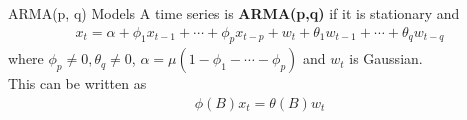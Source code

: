\documentclass[ignorenonframetext,xcolor=x11names]{beamer}
\begin{document}
\begin{frame}[label=full]{ARMA(p, q) Models}
A time series is \textbf{ARMA(p,q)} if it is stationary and
\begin{align*}
x_t = \alpha + \phi_1 x_{t-1} + \cdots + \phi_p x_{t-p} + w_t + \theta_1 w_{t-1} + \cdots + \theta_q w_{t-q} 
\end{align*}
where $\phi_p \neq 0, \theta_q \neq 0$, $\alpha = \mu(1 - \phi_1 - \cdots - \phi_p)$ and $w_t$ is Gaussian. \\

This can be written as
\begin{align*}
\phi(B) x_t = \theta (B) w_t 
\end{align*}
\end{frame}



\end{document}

